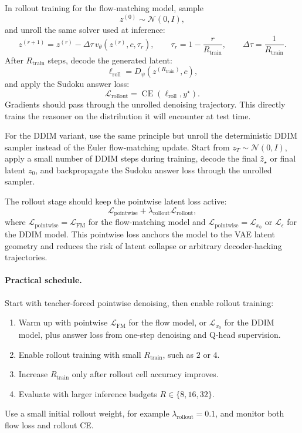 \documentclass[11pt]{article}
\begin{document}
In rollout training for the flow-matching model, sample
\[
    z^{(0)}\sim\mathcal N(0,I),
\]
and unroll the same solver used at inference:
\[
    z^{(r+1)}
    =
    z^{(r)}
    -
    \Delta\tau\,
    v_\theta(z^{(r)},c,\tau_r),
    \qquad
    \tau_r=1-\frac{r}{R_{\mathrm{train}}},
    \qquad
    \Delta\tau=\frac{1}{R_{\mathrm{train}}}.
\]
After \(R_{\mathrm{train}}\) steps, decode the generated latent:
\[
    \ell_{\mathrm{roll}}
    =
    D_\psi(z^{(R_{\mathrm{train}})},c),
\]
and apply the Sudoku answer loss:
\[
    \mathcal L_{\mathrm{rollout}}
    =
    \operatorname{CE}(\ell_{\mathrm{roll}},y^\star).
\]
Gradients should pass through the unrolled denoising trajectory. This directly trains the reasoner on the distribution it will encounter at test time.

For the DDIM variant, use the same principle but unroll the deterministic DDIM sampler instead of the Euler flow-matching update. Start from \(z_T\sim\mathcal N(0,I)\), apply a small number of DDIM steps during training, decode the final \(\hat z_\star\) or final latent \(z_0\), and backpropagate the Sudoku answer loss through the unrolled sampler.

The rollout stage should keep the pointwise latent loss active:
\[
    \mathcal L_{\mathrm{pointwise}}
    +
    \lambda_{\mathrm{rollout}}\mathcal L_{\mathrm{rollout}},
\]
where \(\mathcal L_{\mathrm{pointwise}}=\mathcal L_{\mathrm{FM}}\) for the flow-matching model and \(\mathcal L_{\mathrm{pointwise}}=\mathcal L_{x_0}\) or \(\mathcal L_{\epsilon}\) for the DDIM model. This pointwise loss anchors the model to the VAE latent geometry and reduces the risk of latent collapse or arbitrary decoder-hacking trajectories.

\paragraph{Practical schedule.}
Start with teacher-forced pointwise denoising, then enable rollout training:
\begin{enumerate}[itemsep=0pt]
    \item Warm up with pointwise \(\mathcal L_{\mathrm{FM}}\) for the flow model, or \(\mathcal L_{x_0}\) for the DDIM model, plus answer loss from one-step denoising and Q-head supervision.
    \item Enable rollout training with small \(R_{\mathrm{train}}\), such as \(2\) or \(4\).
    \item Increase \(R_{\mathrm{train}}\) only after rollout cell accuracy improves.
    \item Evaluate with larger inference budgets \(R\in\{8,16,32\}\).
\end{enumerate}
Use a small initial rollout weight, for example \(\lambda_{\mathrm{rollout}}=0.1\), and monitor both flow loss and rollout CE.
\end{document}
